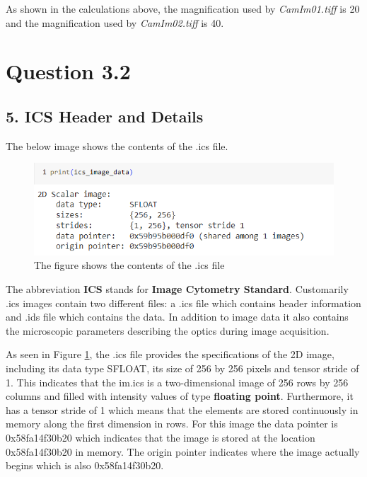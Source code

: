 \documentclass{article}
\begin{document}
As shown in the calculations above, the magnification used by \emph{CamIm01.tiff} is 20 and the magnification used by \emph{CamIm02.tiff} is 40.
\clearpage
\section*{Question 3.2}
\subsection*{5. ICS Header and Details}
The below image shows the contents of the .ics file.
\begin{figure}[h!]
\centering
\includegraphics[width=0.8\linewidth]{Report/Images/ics_header_image.png}
\caption{\label{fig:ics_header_image}The figure shows the contents of the .ics file}
\end{figure}

The abbreviation \textbf{ICS} stands for \textbf{Image Cytometry Standard}. Customarily .ics images contain two different files: a .ics file which contains header information and .ids file which contains the data. In addition to image data it also contains the microscopic parameters describing the optics during image acquisition. \newline

As seen in Figure \ref{fig:ics_header_image}, the .ics file provides the specifications of the 2D image, including its data type SFLOAT, its size of 256 by 256 pixels and tensor stride of 1. This indicates that the im.ics is a two-dimensional image of 256 rows by 256 columns and filled with intensity values of type \textbf{floating point}. Furthermore, it has a tensor stride of 1 which means that the elements are stored continuously in memory along the first dimension in rows.  For this image the data pointer is 0x58fa14f30b20 which indicates that the image is stored at the location 0x58fa14f30b20 in memory. The origin pointer indicates where the image actually begins which is also 0x58fa14f30b20. \newline
\end{document}
